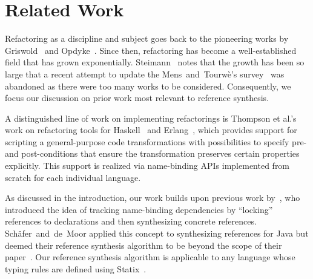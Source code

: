 \section{Related Work}%
\label{sec:related-work}


Refactoring as a discipline and subject goes back to the pioneering works by Griswold~\cite{Griswold:1992:PRA:144627} and Opdyke~\cite{Opdyke1992}.
Since then, refactoring has become a well-established field that has grown exponentially.
Steimann~\cite{Steimann18} notes that the growth has been so large that a recent attempt to update the Mens~and~Tourw\`{e}'s survey~\cite{MensT04} was abandoned as there were too many works to be considered.
Consequently, we focus our discussion on prior work most relevant to reference synthesis.

A distinguished line of work on implementing refactorings is Thompson et al.'s work on refactoring tools for Haskell~\cite{LiRT03,LiTR05} and Erlang~\cite{2455}, which provides support for scripting a general-purpose code transformations with possibilities to specify pre- and post-conditions that ensure the transformation preserves certain properties explicitly.
This support is realized via name-binding APIs implemented from scratch for each individual language.


As discussed in the introduction, our work builds upon previous work by~\citet{EkmanSV08,SchaferEM08,SchaferTST12,SchaferMOOPSLA2010}, who introduced the idea of tracking name-binding dependencies by ``locking'' references to declarations and then synthesizing concrete references.
Sch\"{a}fer~and~de~Moor applied this concept to synthesizing references for Java but deemed their reference synthesis algorithm to be beyond the scope of their paper~\cite[\S{2}]{SchaferMOOPSLA2010}.
Our reference synthesis algorithm is applicable to any language whose typing rules are defined using Statix~\cite{AntwerpenPRV18}.


